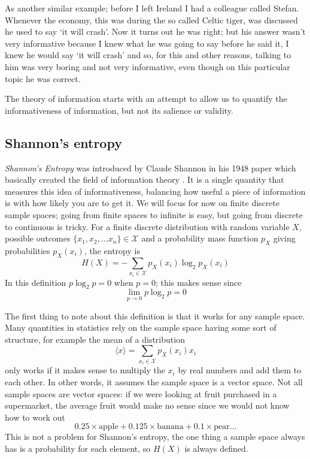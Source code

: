 \documentclass[12pt]{article}
\begin{document}
As another similar example; before I left Ireland I had a colleague
called Stefan. Whenever the economy, this was during the so called
Celtic tiger, was discussed he used to say \lq{}it will
crash\rq{}. Now it turns out he was right; but his answer wasn't very
informative because I knew what he was going to say before he said it,
I knew he would say \lq{}it will crash\rq{} and so, for this and other
reasons, talking to him was very boring and not very informative, even
though on this particular topic he was correct.

The theory of information starts with an attempt to allow us to
quantify the informativeness of information, but not its salience or
validity.

\subsection*{Shannon's entropy}


\textsl{Shannon's Entropy} was introduced by Claude Shannon in his
1948 paper which basically created the field of information theory
\citep{Shannon1948}. It is a single quantity that measures this idea of
informativeness, balancing how useful a piece of information is with
how likely you are to get it. We will focus for now on finite discrete
sample spaces; going from finite spaces to infinite is easy, but going
from discrete to continuous is tricky. For a finite discrete
distribution with random variable $X$, possible outcomes
$\{x_1,x_2,\ldots x_n\}\in\mathcal{X}$ and a probability mass function
$p_X$ giving probabilities $p_X(x_i)$, the entropy is
\begin{equation}
H(X)=-\sum_{x_i\in \mathcal{X}}{p_X(x_i)\log_2p_X(x_i)}
\end{equation}
In this definition $p\log_2{p}=0$ when $p=0$; this makes sense since
\begin{equation}
\lim_{p\rightarrow 0}p\log_2{p}=0
\end{equation}


The first thing to note about this definition is that it works for any
sample space. Many quantities in statistics rely on the sample space
having some sort of structure, for example the mean of a distribution
\begin{equation}
\langle x\rangle = \sum_{x_i\in \mathcal{X}}{p_X(x_i)x_i}
\end{equation}
only works if it makes sense to multiply the $x_i$ by real numbers and
add them to each other. In other words, it assumes the sample space is
a vector space. Not all sample spaces are vector spaces: if we were
looking at fruit purchased in a supermarket, the average fruit would
make no sense since we would not know how to work out
\begin{equation}
0.25\times \mbox{apple}+0.125\times \mbox{banana}+0.1\times \mbox{pear}\ldots
\end{equation}
This is not a problem for Shannon's entropy, the one
thing a sample space always has is a probability for each element, so
$H(X)$ is always defined.
\end{document}
